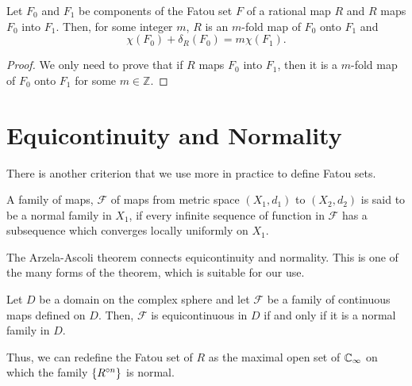 \begin{theorem}
	Let \( F_0 \) and \( F_1 \) be components of the Fatou set \( F \) of a rational map \( R \)
	and \( R \) maps \( F_0 \) into \( F_1 \). Then, for some integer \( m \), \( R \) is an \( m \)-fold
	map of \( F_0 \) onto \( F_1 \) and \[
		\chi(F_0)+\delta_R(F_0)=m\chi(F_1)
	.\] 
\end{theorem}
\begin{proof}
	We only need to prove that if \( R \) maps \( F_0 \) into \( F_1 \), then it is a \( m \)-fold map
	of \( F_0 \) onto \( F_1 \) for some \( m \in \mathbb{Z} \).
\end{proof}

\section{Equicontinuity and Normality}
There is another criterion that we use more in practice to define Fatou sets.
\begin{definition}
	A family of maps, \( \mathcal{F} \) of maps from metric space \( (X_1,d_1) \) to \( (X_2,d_2) \) is said to be a normal family in \( X_1 \),
	if every infinite sequence of function in \( \mathcal{F} \) has a subsequence which converges locally uniformly on \( X_1 \).
\end{definition}

The Arzela-Ascoli theorem connects equicontinuity and normality. This is one of the many forms of the theorem, which is suitable for our use.
\begin{AAT}
	Let \( D \) be a domain on the complex sphere and let \( \mathcal{F} \) be a family of continuous maps defined on \( D \).
	Then, \( \mathcal{F} \) is equicontinuous in \( D \) if and only if  it is a normal family in \( D \).
\end{AAT}
Thus, we can redefine the Fatou set of \( R \) as the maximal open set of \( \mathbb{C}_\infty \) 
on which the family \( \{\ror[n]\} \) is normal.

